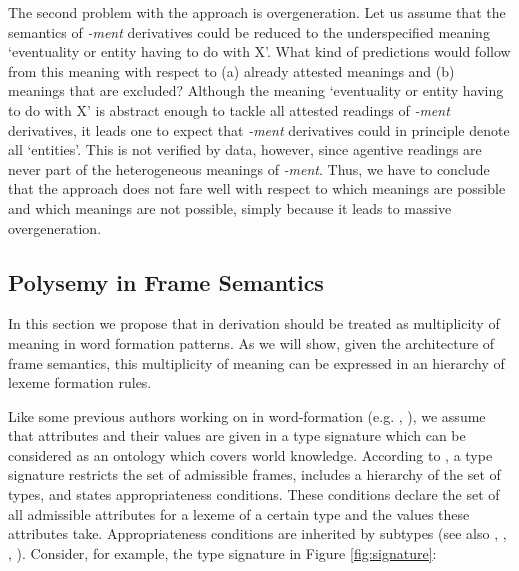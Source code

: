 \documentclass[output=paper]{langsci/langscibook}
\begin{document}
The second problem with the  approach is overgeneration. Let us assume that the semantics of \textit{-ment} derivatives could be reduced to the underspecified meaning `eventuality or entity having to do with X'. What kind of predictions would follow from this meaning with respect to (a) already attested meanings and (b) meanings that are excluded? Although the meaning `eventuality or entity having to do with X' is abstract enough to tackle all attested readings of \textit{-ment} derivatives, it leads one to expect that \textit{-ment} derivatives could in principle denote all `entities'. This is not verified by data, however, since agentive readings are never part of the heterogeneous meanings of \textit{-ment}. Thus, we have to conclude that the  approach does not fare well with respect to which meanings are possible and which meanings are not possible, simply because it leads to massive overgeneration.

\subsection{Polysemy in Frame Semantics}
In this section we propose that  in derivation should be treated as multiplicity of meaning in word formation patterns. As we will show, given the architecture of frame semantics, this multiplicity of meaning can be expressed in an  hierarchy of lexeme formation rules.

Like some previous authors working on  in word-formation (e.g. \citealt{Desmets.2009}, \citealt{Tribout.2010}), we assume that attributes and their values are given in a type signature which can be considered as an ontology which covers world knowledge. According to \citet[203-204]{Petersen.2014}, a type signature restricts the set of admissible frames, includes a hierarchy of the set of types, and states appropriateness conditions. These conditions declare the set of all admissible attributes for a lexeme of a certain type and the values these attributes take. Appropriateness conditions are inherited by subtypes (see also \citealt{Riehemann.1998}, \citealt{Koenig99}, \citealt{Bonami.2016}, \citealt{Andreou.2017a}). Consider, for example, the type signature in Figure \ref{fig:signature}:

\newcommand{\stack}[1]{{\upshape\itshape\begin{tabular}[t]{@{}c@{}}#1\end{tabular}}}
\newcommand{\ssc}[1]{\textsc{\upshape#1}}
\end{document}
